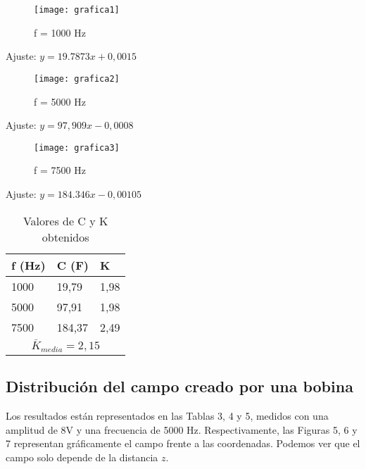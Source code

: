 \documentclass[a4paper,12pt,spanish]{article}
\begin{document}
\begin{figure}[H]
	\centering
	\texttt{[image: grafica1]}
	\caption{f = 1000 Hz}
\end{figure}

Ajuste: $ y = 19.7873x+ 0,0015$




\begin{figure}[H]
	\centering
	\texttt{[image: grafica2]}
	\caption{f = 5000 Hz}
\end{figure}

Ajuste: $ y = 97,909x - 0,0008$


\begin{figure}[H]
	\centering
	\texttt{[image: grafica3]}
	\caption{f = 7500 Hz}
\end{figure}

Ajuste: $ y = 184.346 x - 0,00105$



\vspace{\baselineskip}

\begin{table}[H]
	\centering
	\begin{tabular}{|lll|}
		\hline
		\multicolumn{1}{|c|}{f (Hz)} & \multicolumn{1}{l|}{C (F)} & K       \\ \hline
		1000                         & 19,79                  & 1,98   \\
		5000                         & 97,91                  & 1,98  \\
		7500                         & 184,37                 & 2,49 \\ \hline
		\multicolumn{3}{|c|}{$\bar{K}_{media} = 2,15$}                                \\ \hline
	\end{tabular}
	\caption{Valores de C y K obtenidos}
\end{table}


\subsection{Distribución del campo creado por una bobina}

Los resultados están representados en las Tablas 3, 4 y 5, medidos con una amplitud de 8V y una frecuencia de 5000 Hz.
Respectivamente, las Figuras 5, 6 y 7 representan gráficamente el campo frente a las coordenadas. Podemos ver que el campo solo depende de la distancia $z$.
\end{document}
